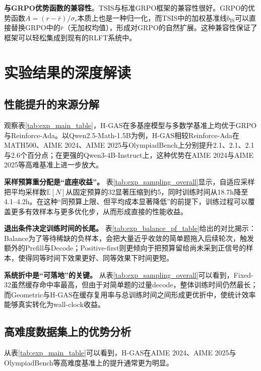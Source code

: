 \textbf{与GRPO优势函数的兼容性}。TSIS与标准GRPO框架的兼容性很好。GRPO的优势函数$A = (r - \bar{r}) / \sigma_r$本质上也是一种归一化，而TSIS中的加权基准线$b_{\text{IS}}$可以直接替换GRPO中的$\bar{r}$（无加权均值），形成对GRPO的自然扩展。这种兼容性保证了框架可以轻松集成到现有的RLFT系统中。

\section{实验结果的深度解读}
\label{sec:results_deep_analysis}

\subsection{性能提升的来源分解}
\label{subsec:performance_gain_decomposition}

观察表\ref{tab:exp_main_table}，H-GAS在多基座模型与多数学基准上均优于GRPO与Reinforce-Ada。以Qwen2.5-Math-1.5B为例，H-GAS相较Reinforce-Ada在MATH500、AIME 2024、AIME 2025与OlympiadBench上分别提升2.1、2.1、2.1与2.6个百分点；在更强的Qwen3-4B-Instruct上，这种优势在AIME 2024与AIME 2025等高难基准上进一步放大。

\textbf{采样预算重分配是“底座收益”。} 表\ref{tab:exp_sampling_overall}显示，自适应采样把平均采样数$\mathbb{E}[N]$从固定预算的32显著压缩到约5，同时训练时间从18.7h降至4.1--4.2h。在这种“同预算上限、但平均成本显著降低”的前提下，训练过程可以覆盖更多有效样本与更多优化步，从而形成直接的性能收益。

\textbf{退出条件决定训练时间的长尾。} 表\ref{tab:exp_balance_pf_table}给出的对比揭示：Balance为了等待稀缺的负样本，会把大量近乎收敛的简单题拖入后续轮次，触发额外的Prefill与Decode；Positive-first则更倾向于把预算留给尚未采到正信号的样本，使得同等时间下效果更好、同等效果下时间更短。

\textbf{系统折中是“可落地”的关键。} 从表\ref{tab:exp_sampling_overall}可以看到，Fixed-32虽然缓存命中率最高，但由于对简单题的过量decode，整体训练时间仍然最长；而Geometric与H-GAS在缓存复用率与总训练时间之间形成更优折中，使统计效率能够真实转化为wall-clock收益。

\subsection{高难度数据集上的优势分析}
\label{subsec:hard_dataset_advantage}

从表\ref{tab:exp_main_table}可以看到，H-GAS在AIME 2024、AIME 2025与OlympiadBench等高难度基准上的提升通常更为明显。

